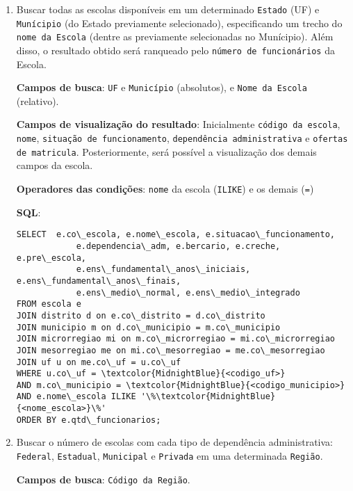 \documentclass[12pt,a4paper]{article}
\begin{document}
\begin{enumerate}
    \item 
        Buscar todas as escolas disponíveis em um determinado \texttt{Estado} (UF) e \texttt{Munícipio} (do Estado previamente selecionado), especificando um trecho do \texttt{nome da Escola} (dentre as previamente selecionadas no Munícipio). Além disso, o resultado obtido será ranqueado pelo \texttt{número de funcionários} da Escola.
        
        \textbf{Campos de busca}: \texttt{UF} e \texttt{Município} (absolutos), e \texttt{Nome da Escola} (relativo). 
        
        \textbf{Campos de visualização do resultado}: Inicialmente \texttt{código da escola}, \texttt{nome}, \texttt{situação de funcionamento}, \texttt{dependência administrativa} e  \texttt{ofertas de matricula}. Posteriormente, será possível a visualização dos demais campos da escola.
    
        \textbf{Operadores das condições}: \texttt{nome} da escola (\texttt{ILIKE}) e os demais (\texttt{=})
        
        \textbf{SQL}:
        \begin{Verbatim}[commandchars=\\\{\}]
SELECT  e.co\_escola, e.nome\_escola, e.situacao\_funcionamento,
            e.dependencia\_adm, e.bercario, e.creche, e.pre\_escola,
            e.ens\_fundamental\_anos\_iniciais, e.ens\_fundamental\_anos\_finais,
            e.ens\_medio\_normal, e.ens\_medio\_integrado
FROM escola e
JOIN distrito d on e.co\_distrito = d.co\_distrito
JOIN municipio m on d.co\_municipio = m.co\_municipio
JOIN microrregiao mi on m.co\_microrregiao = mi.co\_microrregiao
JOIN mesorregiao me on mi.co\_mesorregiao = me.co\_mesorregiao
JOIN uf u on me.co\_uf = u.co\_uf
WHERE u.co\_uf = \textcolor{MidnightBlue}{<codigo_uf>}
AND m.co\_municipio = \textcolor{MidnightBlue}{<codigo_municipio>}
AND e.nome\_escola ILIKE '\%\textcolor{MidnightBlue}{<nome_escola>}\%'
ORDER BY e.qtd\_funcionarios;
        \end{Verbatim}
    
    \vspace{0.5cm}
    \item 
         Buscar o número de escolas com cada tipo de dependência administrativa: \texttt{Federal}, \texttt{Estadual}, \texttt{Municipal} e \texttt{Privada} em uma determinada \texttt{Região}. 
    
        \textbf{Campos de busca}: \texttt{Código da Região}.
        

\end{enumerate}
\end{document}

